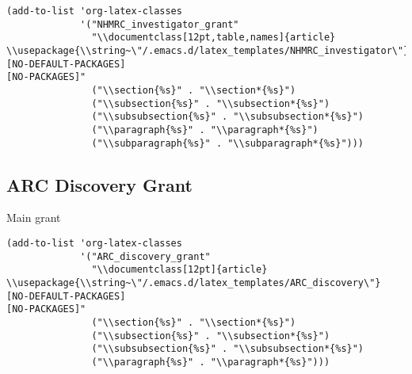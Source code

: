 \documentclass[12pt]{article}
\begin{document}
\begin{verbatim}
(add-to-list 'org-latex-classes
             '("NHMRC_investigator_grant"
               "\\documentclass[12pt,table,names]{article}
\\usepackage{\\string~\"/.emacs.d/latex_templates/NHMRC_investigator\"}
[NO-DEFAULT-PACKAGES]
[NO-PACKAGES]"
               ("\\section{%s}" . "\\section*{%s}")
               ("\\subsection{%s}" . "\\subsection*{%s}")
               ("\\subsubsection{%s}" . "\\subsubsection*{%s}")
               ("\\paragraph{%s}" . "\\paragraph*{%s}")
               ("\\subparagraph{%s}" . "\\subparagraph*{%s}")))
\end{verbatim}

\subsection{ARC Discovery Grant}
\label{sec:org5587e79}

Main grant 
\begin{verbatim}
(add-to-list 'org-latex-classes
             '("ARC_discovery_grant"
               "\\documentclass[12pt]{article}
\\usepackage{\\string~\"/.emacs.d/latex_templates/ARC_discovery\"}
[NO-DEFAULT-PACKAGES]
[NO-PACKAGES]"
               ("\\section{%s}" . "\\section*{%s}")
               ("\\subsection{%s}" . "\\subsection*{%s}")
               ("\\subsubsection{%s}" . "\\subsubsection*{%s}")
               ("\\paragraph{%s}" . "\\paragraph*{%s}")))
\end{verbatim}
\end{document}
